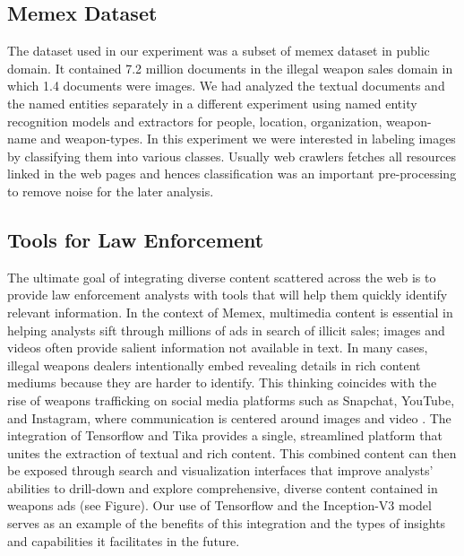 \subsection{Memex Dataset} \label{sec:memex-dataset}
The dataset used in our experiment was a subset of memex dataset in public domain. It contained 7.2 million documents in the illegal weapon sales domain in which 1.4 documents were images. We had analyzed the textual documents and the named entities separately in a different experiment using named entity recognition models and extractors for people, location, organization, weapon-name and weapon-types. In this experiment we were interested in labeling images by classifying them into various classes. Usually web crawlers fetches all resources linked in the web pages and hences classification was an important pre-processing to remove noise for the later analysis.

\subsection{Tools for Law Enforcement} \label{sec:memex-tools}
The ultimate goal of integrating diverse content scattered across the web is to provide law enforcement analysts with tools that will help them quickly identify relevant information. In the context of Memex, multimedia content is essential in helping analysts sift through millions of ads in search of illicit sales; images and videos often provide salient information not available in text. In many cases, illegal weapons dealers intentionally embed revealing details in rich content mediums because they are harder to identify. This thinking coincides with the rise of weapons trafficking on social media platforms such as Snapchat, YouTube, and Instagram, where communication is centered around images and video \cite{socialmedia}. The integration of Tensorflow and Tika provides a single, streamlined platform that unites the extraction of textual and rich content. This combined content can then be exposed through search and visualization interfaces that improve analysts' abilities to drill-down and explore comprehensive, diverse content contained in weapons ads (see Figure). Our use of Tensorflow and the Inception-V3 model serves as an example of the benefits of this integration and the types of insights and capabilities it facilitates in the future. 